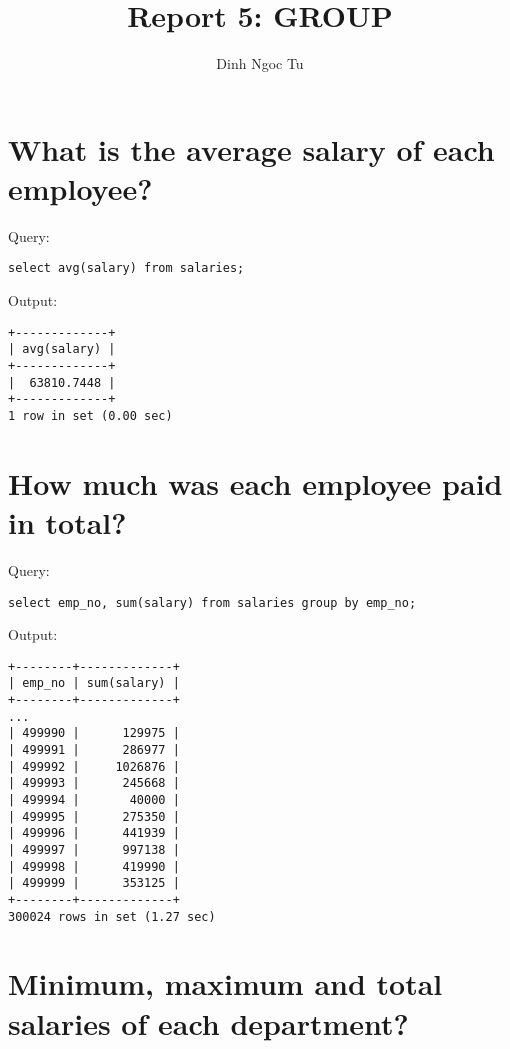 \documentclass[12pt]{article}
\title{Report 5: GROUP}
\author{Dinh Ngoc Tu}
\begin{document}
\maketitle


\section{What is the average salary of each employee?}

Query:

\begin{verbatim}
select avg(salary) from salaries;
\end{verbatim}

Output:

\begin{verbatim}
+-------------+
| avg(salary) |
+-------------+
|  63810.7448 |
+-------------+
1 row in set (0.00 sec)
\end{verbatim}


\section{How much was each employee paid in total?}

Query:

\begin{verbatim}
select emp_no, sum(salary) from salaries group by emp_no;
\end{verbatim}

Output:

\begin{verbatim}
+--------+-------------+
| emp_no | sum(salary) |
+--------+-------------+
...
| 499990 |      129975 |
| 499991 |      286977 |
| 499992 |     1026876 |
| 499993 |      245668 |
| 499994 |       40000 |
| 499995 |      275350 |
| 499996 |      441939 |
| 499997 |      997138 |
| 499998 |      419990 |
| 499999 |      353125 |
+--------+-------------+
300024 rows in set (1.27 sec)
\end{verbatim}


\section{Minimum, maximum and total salaries of each department?}
\end{document}
